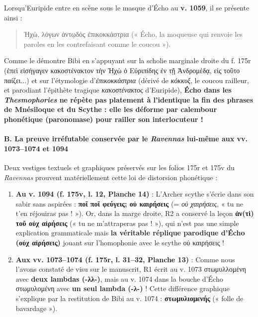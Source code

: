 \documentclass[11pt, a4paper, twoside]{article}
\renewcommand{\_}{\origunderscore\penalty0\relax}
\renewcommand{\texttt}[1]{#1}
\newcommand{\Run}{\textbf{R}\textsuperscript{1}}
\newcommand{\Rdeux}{\textbf{R}\textsuperscript{2}}
\newcommand{\Bibi}{\textit{Bibi}}
\def\Run{R1}%
\def\Rdeux{R2}%
\def\Bibi{Bibi}%
\begin{document}
Lorsqu'Euripide entre en scène sous le masque d'Écho au \textbf{v. 1059}, il se présente ainsi :
\begin{quote}
\texttt{Ἠχὼ, λόγων ἀντῳδὸς ἐπικοκκάστρια} (« Écho, la moqueuse qui renvoie les paroles en les contrefaisant comme le coucou »).\\
\end{quote}

Comme le démontre \Bibi{} en s'appuyant sur la scholie marginale droite du \texttt{f. 175r} (\texttt{ἐπεὶ εἰσήγαγεν κακοστένακτον τὴν Ἠχὼ ὁ Εὐριπίδης ἐν τῇ Ἀνδρομέδᾳ, εἰς τοῦτο παίζει...}) et sur l'étymologie d'\textit{ἐπικοκκάστρια} (dérivé de \textit{κόκκυξ}, le coucou railleur, et parodiant l'épithète tragique \textit{κακοστένακτος} d'Euripide), \textbf{Écho dans les \textit{Thesmophories} ne répète pas platement à l'identique la fin des phrases de Mnésiloque et du Scythe : elle les déforme par calembour phonétique (paronomase) pour railler son interlocuteur !}

\paragraph*{B. La preuve irréfutable conservée par le \textit{Ravennas} lui-même aux vv. 1073–1074 et 1094}

Deux vestiges textuels et graphiques préservés sur les folios \texttt{175r} et \texttt{175v} du \textit{Ravennas} prouvent matériellement cette loi de distorsion phonétique :
\begin{enumerate}[leftmargin=1.6em, itemsep=2pt]
  \item \textbf{Au v. 1094 (\texttt{f. 175v}, l. 12, Planche 14)} : L'Archer scythe s'écrie dans son sabir sans aspirées : \textbf{\texttt{ποῖ ποῖ φεύγεις; οὐ καιρήσεις}} (= \textit{οὐ χαιρήσεις}, « tu ne t'en réjouiras pas ! »). Or, dans la marge droite, \Rdeux{} a conservé la leçon \textbf{\texttt{ἀν(τὶ) τοῦ οὐχ αἱρήσεις}} (« tu ne m'attraperas pas ! »), qui n'est pas une simple explication grammaticale mais \textbf{la véritable réplique parodique d'Écho (\texttt{οὐχ αἱρήσεις})} jouant sur l'homophonie avec le scythe \texttt{οὐ καιρήσεις} !
  \item \textbf{Aux vv. 1073–1074 (\texttt{f. 175r}, l. 31–32, Planche 13)} : Comme nous l'avons constaté de visu sur le manuscrit, \Run{} écrit au v. 1073 \texttt{στωμυλλομένη} avec \textbf{deux lambdas (\texttt{-λλ-})}, mais au v. 1074 dans la bouche d'Écho \texttt{στωμυλομένη} avec \textbf{un seul lambda (\texttt{-λ-})} ! Cette différence graphique s'explique par la restitution de \Bibi{} au v. 1074 : \textbf{\texttt{στωμυλιομενής}} (« folle de bavardage »).
\end{enumerate}
\end{document}
